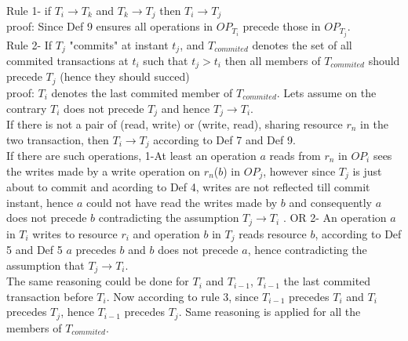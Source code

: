 \documentclass[a4paper, 11pt]{article}
\begin{document}




Rule 1- if $T_i \rightarrow T_k$ and $T_k \rightarrow T_j$ then $T_i \rightarrow T_j$ \\

proof: Since Def 9 ensures all operations in $OP_{T_i}$ precede those in $OP_{T_j}$. \\ 

Rule 2- If $T_j$ "commits" at instant $t_j$, and $T_{commited}$ denotes the set of all commited transactions at $t_i$ such that $t_j > t_i$ then all members of $T_{commited}$ should precede $T_j$ (hence they should succed)\\

proof: $T_i$ denotes the last commited member of $T_{commited}$. Lets assume on the contrary $T_i$ does not precede $T_j$ and hence $T_j \rightarrow T_i$.\\

If there is not a pair of (read, write) or (write, read), sharing resource $r_n$ in the two transaction, then $T_i \rightarrow T_j$ according to Def 7 and Def 9.\\

If there are such operations, 1-At least an operation $a$ reads from $r_n$ in $OP_i$ sees the writes made by a write operation on $r_n$($b$) in $OP_j$, however since $T_j$ is just about to commit and acording to Def 4, writes are not reflected till commit instant, hence $a$ could not have read the writes made by $b$ and consequently $a$ does not precede $b$ contradicting the assumption $T_j \rightarrow T_i$ . OR 2- An operation $a$ in $T_i$ writes to resource $r_i$ and operation $b$ in $T_j$ reads resource $b$, according to Def 5 and Def 5 $a$ precedes $b$ and $b$ does not precede $a$, hence contradicting the assumption that $T_j \rightarrow T_i$.\\ 


The same reasoning could be done for $T_i$ and $T_{i-1}$, $T_{i-1}$ the last commited transaction before $T_{i}$. Now according to rule 3, since $T_{i-1}$ precedes $T_i$ and $T_i$ precedes $T_{j}$, hence $T_{i-1}$ precedes $T_{j}$. Same reasoning is applied for all the members of $T_{commited}$. \\
\end{document}
